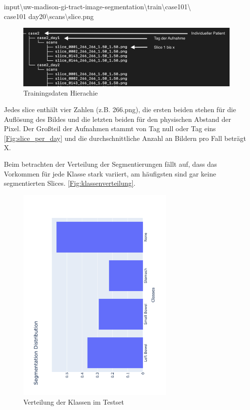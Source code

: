 input\textbackslash uw-madison-gi-tract-image-segmentation\textbackslash train\textbackslash case101\textbackslash \\case101\textunderscore
day20\textbackslash scans\textbackslash slice.png

\begin{figure}[htb]
	\begin{center}
		\includegraphics[width=450pt]{bilder/data_tree}
		\caption{Trainingsdaten Hierachie}\label{Fig:train-data}
	\end{center}
\end{figure}

Jedes slice enthält vier Zahlen (z.B. 266.png), die ersten beiden stehen für die Auflösung des Bildes und die letzten beiden für den physischen Abstand der Pixel. Der Großteil der Aufnahmen stammt von Tag null oder Tag eins \autoref{Fig:slice_per_day} und die durchschnittliche Anzahl an Bildern pro Fall beträgt X.

Beim betrachten der Verteilung der Segmentierungen fällt auf, dass das Vorkommen für jede Klasse stark variiert, am häufigsten sind gar keine segmentierten Slices. \autoref{Fig:klassenverteilung}.

\begin{figure}[htb]
	\begin{center}
		\includegraphics[width=220pt , angle=270]{bilder/segmentation_distribution}
		\caption{Verteilung der Klassen im Testset}\label{Fig:klassenverteilung}
	\end{center}
\end{figure}

